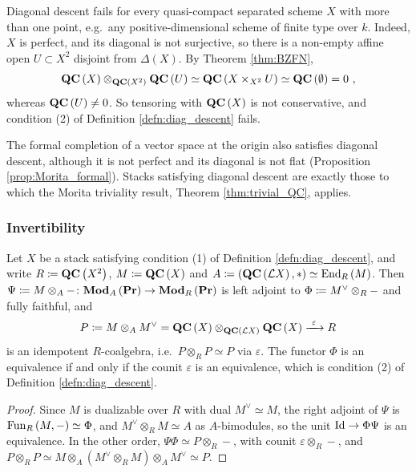 \begin{rmk}
\label{rmk:diag_descent_fails}
Diagonal descent fails for every quasi-compact separated scheme $X$ with more than one point,
e.g.\ any positive-dimensional scheme of finite type over $k$.
Indeed, $X$ is perfect, and its diagonal is not surjective, so there is a non-empty affine open
$U\subset X^2$ disjoint from $\Delta\left(X\right)$. By Theorem \ref{thm:BZFN},
\begin{equation*}
\QC\left(X\right)\otimes_{\QC\left(X^2\right)}\QC\left(U\right)\simeq
\QC\left(X\times_{X^2}U\right)\simeq\QC\left(\emptyset\right)=0 \ ,
\end{equation*}
whereas $\mathbf{QC}\left(U\right)\neq0$. So tensoring with $\mathbf{QC}\left(X\right)$ is not conservative,
and condition (2) of Definition \ref{defn:diag_descent} fails.
\end{rmk}

The formal completion of a vector space at the origin also satisfies diagonal descent,
although it is not perfect and its diagonal is not flat (Proposition
\ref{prop:Morita_formal}).
Stacks satisfying diagonal descent are exactly those to which the Morita triviality result,
Theorem \ref{thm:trivial_QC}, applies.

\subsubsection{Invertibility}

\begin{lem}
\label{lem:Morita_context}
Let $X$ be a stack satisfying condition (1) of Definition \ref{defn:diag_descent}, and write
$R\coloneqq\mathbf{QC}\left(X^2\right)$, $M\coloneqq\mathbf{QC}\left(X\right)$ and
$A\coloneqq\left(\mathbf{QC}\left(\mathcal{L} X\right),*\right)\simeq\operatorname{End}_R\left(M\right)$. Then
$\Psi\coloneqq M\otimes_A-\colon\mathbf{Mod}_A\left(\mathbf{Pr}\right)\to\mathbf{Mod}_R\left(\mathbf{Pr}\right)$ is left adjoint
to $\Phi\coloneqq M^\vee\otimes_R-$ and fully faithful, and
\begin{equation*}
P\coloneqq M\otimes_A M^\vee=\mathbf{QC}\left(X\right)\otimes_{\mathbf{QC}\left(\mathcal{L} X\right)}\mathbf{QC}\left(X\right)
\xrightarrow{\ \varepsilon\ } R
\end{equation*}
is an idempotent $R$-coalgebra, i.e.\ $P\otimes_R P\simeq P$ via $\varepsilon$. The functor $\Phi$ is an equivalence if and only if the counit
$\varepsilon$ is an equivalence, which is condition (2) of Definition \ref{defn:diag_descent}.
\end{lem}

\begin{proof}
Since $M$ is dualizable over $R$ with dual $M^\vee\simeq M$, the right adjoint of $\Psi$ is
$\operatorname{Fun}_R\left(M,-\right)\simeq\Phi$, and $M^\vee\otimes_R M\simeq A$ as $A$-bimodules, so the
unit $\operatorname{Id}\to\Phi\Psi$ is an equivalence. In the other order, $\Psi\Phi\simeq P\otimes_R-$, with
counit $\varepsilon\otimes_R-$, and
$P\otimes_R P\simeq M\otimes_A\left(M^\vee\otimes_R M\right)\otimes_A M^\vee\simeq P$.
\end{proof}

